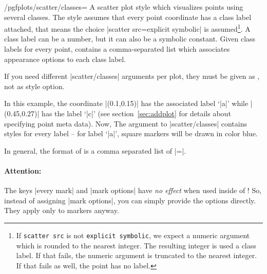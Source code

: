 \label{pgfplots:scatterclasses}
\begin{stylekey}{/pgfplots/scatter/classes=}
	A scatter plot style which visualizes points using several classes. The style assumes that every point coordinate has a class label attached, that means the choice |scatter src=explicit symbolic| is assumed\footnote{If \texttt{scatter src} is not \texttt{explicit symbolic}, we expect a numeric argument which is rounded to the nearest integer. The resulting integer is used a class label. If that fails, the numeric argument is truncated to the nearest integer. If that fails as well, the point has no label.}. A class label can be a number, but it can also be a symbolic constant. Given class labels for every point,  contains a comma-separated list which associates appearance options to each class label.

	If you need different |scatter/classes| arguments per plot, they must be given as , not as style option.
\begin{codeexample}[]
\end{codeexample}
In this example, the coordinate |(0.1,0.15)| has the associated label `|a|' while |(0.45,0.27)| has the label `|c|' (see section~\ref{sec:addplot} for details about specifying point meta data). Now, The argument to |scatter/classes| contains styles for every label -- for label `|a|', square markers will be drawn in color blue. 

In general, the format of  is a comma separated list of |=|.

\paragraph{Attention:} The keys |every mark| and |mark options| have \emph{no effect} when used inside of ! So, instead of assigning |mark options|, you can simply provide the options directly. They apply only to markers anyway.
\end{stylekey}


